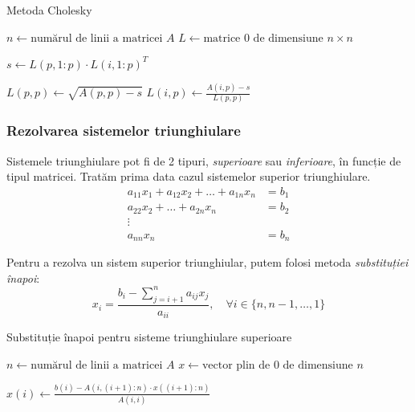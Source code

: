 \documentclass{exam}
\newcommand{\octavescript}[2]{
	
}
\begin{document}

\begin{algorithm}
	\caption{Metoda Cholesky}
	\begin{algorithmic}[1]
		\State \( n \gets \text{numărul de linii a matricei } A \)
		\State \( L \gets \text{matrice 0 de dimensiune } n \times n \)

		\State \( s \gets L(p, 1:p) \cdot L(i, 1:p)^T \)

		\State \( L(p, p) \gets \sqrt{A(p, p) - s} \)
		\Else
		\State \( L(i, p) \gets \frac{A(i, p) - s}{L(p, p)} \)
		\EndIf
		\EndFor
		\EndFor
	\end{algorithmic}
\end{algorithm}

\subsubsection{Rezolvarea sistemelor triunghiulare}

\par Sistemele triunghiulare pot fi de 2 tipuri, \textit{superioare} sau
\textit{inferioare}, în funcție de tipul matricei. Tratăm prima data cazul
sistemelor superior triunghiulare.
\begin{align*}
	a_{11} x_1 + a_{12} x_2 + \ldots + a_{1n} x_n & = b_1 \\
	a_{22} x_2 + \ldots + a_{2n} x_n              & = b_2 \\
	\vdots                                                \\
	a_{nn} x_n                                    & = b_n
\end{align*}

\par Pentru a rezolva un sistem superior triunghiular, putem folosi metoda
\textit{substituției înapoi}:
\begin{equation}
	x_i = \frac{b_i - \sum_{j = i + 1}^{n}{a_{ij} x_j}}{a_{ii}}, \quad \forall i \in \{n, n - 1, \ldots, 1\}
\end{equation}


\begin{algorithm}
	\caption{Substituție înapoi pentru sisteme triunghiulare superioare}
	\begin{algorithmic}[1]
		\State \( n \gets \text{numărul de linii a matricei } A \)
		\State \( x \gets \text{vector plin de 0 de dimensiune } n \)

		\State \( x(i) \gets \frac{b(i) - A(i, (i+1):n) \cdot x((i+1):n)}{A(i, i)} \)
		\EndFor
	\end{algorithmic}
\end{algorithm}
\end{document}

